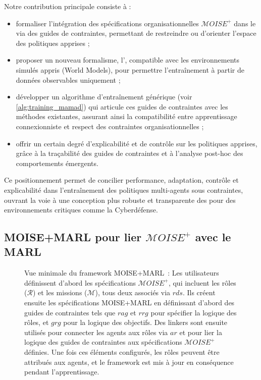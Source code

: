 Notre contribution principale consiste à :
\begin{itemize}
  \item formaliser l'intégration des spécifications organisationnelles $\mathcal{M}OISE^+$ dans le  via des guides de contraintes, permettant de restreindre ou d'orienter l'espace des politiques apprises ;
  \item proposer un nouveau formalisme, l', compatible avec les environnements simulés appris (World Models), pour permettre l'entraînement à partir de données observables uniquement ;
  \item développer un algorithme d'entraînement générique (voir \autoref{alg:training_mamad}) qui articule ces guides de contraintes avec les méthodes  existantes, assurant ainsi la compatibilité entre apprentissage connexionniste et respect des contraintes organisationnelles ;
  \item offrir un certain degré d'explicabilité et de contrôle sur les politiques apprises, grâce à la traçabilité des guides de contraintes et à l'analyse post-hoc des comportements émergents.
\end{itemize}

Ce positionnement permet de concilier performance, adaptation, contrôle et explicabilité dans l'entraînement des politiques multi-agents sous contraintes, ouvrant la voie à une conception plus robuste et transparente des  pour des environnements critiques comme la Cyberdéfense.

\subsection{MOISE+MARL pour lier $\mathcal{M}OISE^+$ avec le MARL}

\begin{figure}[h!]
  \centering
  
  \caption[Vue minimale du framework MOISE+MARL]{Vue minimale du framework MOISE+MARL~: Les utilisateurs définissent d'abord les spécifications $\mathcal{M}OISE^+$, qui incluent les rôles ($\mathcal{R}$) et les missions ($\mathcal{M}$), tous deux associés via $rds$. Ils créent ensuite les spécifications MOISE+MARL en définissant d'abord des guides de contraintes tels que $rag$ et $rrg$ pour spécifier la logique des rôles, et $grg$ pour la logique des objectifs. Des linkers sont ensuite utilisés pour connecter les agents aux rôles via $ar$ et pour lier la logique des guides de contraintes aux spécifications $\mathcal{M}OISE^+$ définies. Une fois ces éléments configurés, les rôles peuvent être attribués aux agents, et le framework  est mis à jour en conséquence pendant l'apprentissage.
  }
  \label{fig:mm_synthesis}
\end{figure}


